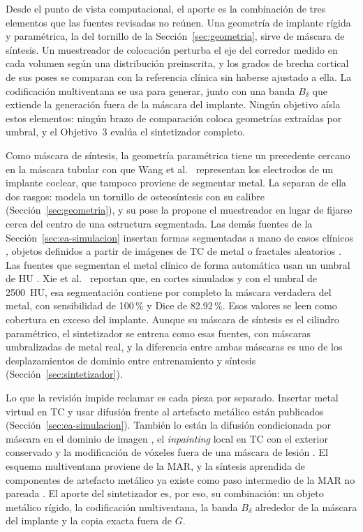 Desde el punto de vista computacional, el aporte es la combinación de tres elementos que las fuentes revisadas no reúnen. Una geometría de implante rígida y paramétrica, la del tornillo de la Sección~\ref{sec:geometria}, sirve de máscara de síntesis. Un muestreador de colocación perturba el eje del corredor medido en cada volumen según una distribución preinscrita, y los grados de brecha cortical de sus poses se comparan con la referencia clínica sin haberse ajustado a ella. La codificación multiventana se usa para generar, junto con una banda $B_{\delta}$ que extiende la generación fuera de la máscara del implante. Ningún objetivo aísla estos elementos: ningún brazo de comparación coloca geometrías extraídas por umbral, y el Objetivo~3 evalúa el sintetizador completo.

Como máscara de síntesis, la geometría paramétrica tiene un precedente cercano en la máscara tubular con que Wang et al.~\cite{wang2019cochlear} representan los electrodos de un implante coclear, que tampoco proviene de segmentar metal. La separan de ella dos rasgos: modela un tornillo de osteosíntesis con su calibre (Sección~\ref{sec:geometria}), y su pose la propone el muestreador en lugar de fijarse cerca del centro de una estructura segmentada. Las demás fuentes de la Sección~\ref{sec:ea-simulacion} insertan formas segmentadas a mano de casos clínicos \cite{zhang2018}, objetos definidos a partir de imágenes de TC de metal \cite{karageorgos2024ddpm} o fractales aleatorios \cite{peters2025hybrid}. Las fuentes que segmentan el metal clínico de forma automática usan un umbral de HU \cite{yun2026simulationdriven,wang2025adaptiveweighting,li2024}. Xie et al.~\cite{xie2024implantsegmentation} reportan que, en cortes simulados y con el umbral de 2500~HU, esa segmentación contiene por completo la máscara verdadera del metal, con sensibilidad de 100\,\% y Dice de 82.92\,\%. Esos valores se leen como cobertura en exceso del implante. Aunque su máscara de síntesis es el cilindro paramétrico, el sintetizador se entrena como esas fuentes, con máscaras umbralizadas de metal real, y la diferencia entre ambas máscaras es uno de los desplazamientos de dominio entre entrenamiento y síntesis (Sección~\ref{sec:sintetizador}).

Lo que la revisión impide reclamar es cada pieza por separado. Insertar metal virtual en TC y usar difusión frente al artefacto metálico están publicados (Sección~\ref{sec:ea-simulacion}). También lo están la difusión condicionada por máscara en el dominio de imagen \cite{konz2024anatomicallycontrollable,ramzan2026claim}, el \emph{inpainting} local en TC con el exterior conservado \cite{zhang2025lefusion} y la modificación de vóxeles fuera de una máscara de lesión \cite{hu2023,jin2021freetumor}. El esquema multiventana proviene de la MAR, y la síntesis aprendida de componentes de artefacto metálico ya existe como paso intermedio de la MAR no pareada \cite{lyu2021ududonet,xia2024pndnet}. El aporte del sintetizador es, por eso, su combinación: un objeto metálico rígido, la codificación multiventana, la banda $B_{\delta}$ alrededor de la máscara del implante y la copia exacta fuera de $G$.

